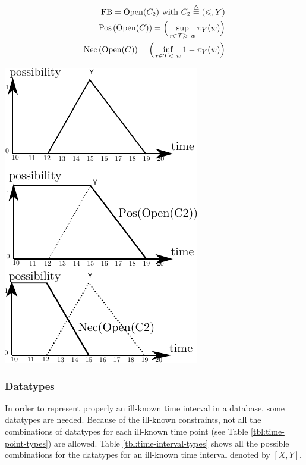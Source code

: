 \begin{eqnarray}
\nonumber
\operatorname{FB} = \operatorname{Open}(C_2) \mbox{ with } C_2\stackrel{\triangle}{=}\left(\leqslant,Y\right)\\
\nonumber
\operatorname{Pos}\left(\operatorname{Open}(C)\right) = \Big(\sup_{r\in\mathcal{T} \geqslant\  w}\pi_{Y}(w)\Big)\\
\nonumber
\operatorname{Nec}\left(\operatorname{Open}(C)\right) = \Big(\inf_{r\in\mathcal{T} <\  w}1-\pi_{Y}(w)\Big)
\end{eqnarray}


\vspace*{13pt}
\begin{center}
{
\includegraphics[scale=1]{./graphs/open-time-interval.pdf}
\label{fig:example-open-time-interval}
}
\end{center}
\vspace*{10pt}
\vspace*{13pt}

\subsubsection{\label{subsubsec:ill-known-time-interval-datatypes}Datatypes}
In order to represent properly an ill-known time interval in a database, some datatypes are needed. Because of the ill-known constraints, not all the combinations of datatypes for each ill-known time point (see Table \ref{tbl:time-point-types}) are allowed. Table \ref{tbl:time-interval-types} shows all the possible combinations for the datatypes for an ill-known time interval denoted by $\left[X, Y\right]$.

